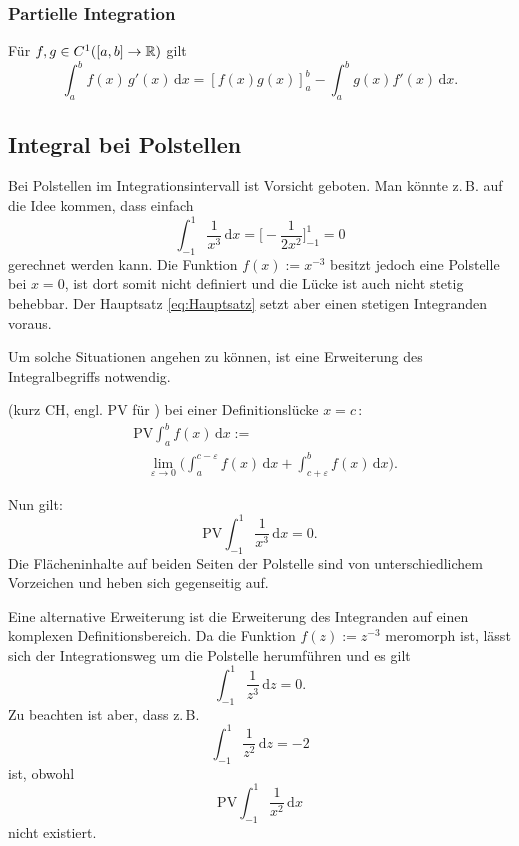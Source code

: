 \subsubsection{Partielle Integration}
Für $f,g\in C^1([a,b]\to\mathbb R)$ gilt
\begin{equation}
\int_a^b f(x)\,g'(x)\,\mathrm dx = [f(x)g(x)]_a^b
- \int_a^b g(x)f'(x)\,\mathrm dx.
\end{equation}

\subsection{Integral bei Polstellen}
Bei Polstellen im Integrationsintervall ist Vorsicht geboten.
Man könnte z.\,B. auf die Idee kommen, dass einfach%
\begin{equation}
\int_{-1}^1 \frac{1}{x^3}\,\mathrm dx
= \Big[-\frac{1}{2x^2}\Big]_{-1}^1 = 0
\end{equation}
gerechnet werden kann. Die Funktion $f(x):=x^{-3}$ besitzt jedoch eine
Polstelle bei $x=0$, ist dort somit nicht definiert und die Lücke
ist auch nicht stetig behebbar. Der Hauptsatz \eqref{eq:Hauptsatz}
setzt aber einen stetigen Integranden voraus. 

Um solche Situationen angehen zu können, ist eine Erweiterung
des Integralbegriffs notwendig.

\newpage
\begin{definition}\mbox{}\newline
{}
(kurz CH, engl. PV für )
bei einer Definitionslücke $x=c$\,:
\begin{equation}
\begin{split}
&\mathrm{PV}\int_a^b f(x)\,\mathrm dx :=\\
&\quad\lim_{\varepsilon\to 0}\bigg(\int_a^{c-\varepsilon} f(x)\,\mathrm dx
+\int_{c+\varepsilon}^b f(x)\,\mathrm dx\bigg).
\end{split}
\end{equation}
\end{definition}
Nun gilt:
\begin{equation}
\mathrm{PV}\int_{-1}^1 \frac{1}{x^3}\,\mathrm dx = 0.
\end{equation}
Die Flächeninhalte auf beiden Seiten der Polstelle sind
von unterschiedlichem Vorzeichen und heben sich gegenseitig auf.

Eine alternative Erweiterung
ist die Erweiterung des Integranden auf einen komplexen
Definitionsbereich. Da die Funktion $f(z):=z^{-3}$ meromorph
ist, lässt sich der Integrationsweg um die Polstelle herumführen
und es gilt%
\begin{equation}
\int_{-1}^1 \frac{1}{z^3}\,\mathrm dz = 0.
\end{equation}
Zu beachten ist aber, dass z.\,B.
\begin{equation}
\int_{-1}^1 \frac{1}{z^2}\,\mathrm dz = -2
\end{equation}
ist, obwohl
\begin{equation}
\mathrm{PV}\int_{-1}^1 \frac{1}{x^2}\,\mathrm dx
\end{equation}
nicht existiert.

